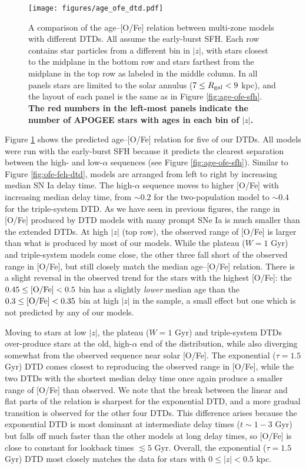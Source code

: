 \documentclass[twocolumn,twocolappendix,linenumbers]{aastex631}
\begin{document}
\begin{figure*}
    \centering
    \texttt{[image: figures/age\_ofe\_dtd.pdf]}
    \caption{A comparison of the age--[O/Fe] relation between multi-zone models with different DTDs. All assume the early-burst SFH. Each row contains star particles from a different bin in $|z|$, with stars closest to the midplane in the bottom row and stars farthest from the midplane in the top row as labeled in the middle column. In all panels stars are limited to the solar annulus ($7\leq R_{\rm gal}<9$ kpc), and the layout of each panel is the same as in Figure \ref{fig:age-ofe-sfh}. {\bf The red numbers in the left-most panels indicate the number of APOGEE stars with  ages in each bin of $|z|$.}}
    \label{fig:age-ofe-dtd}
\end{figure*}

Figure \ref{fig:age-ofe-dtd} shows the predicted age--[O/Fe] relation for five of our DTDs. All models were run with the early-burst SFH because it predicts the clearest separation between the high- and low-$\alpha$ sequences (see Figure \ref{fig:age-ofe-sfh}). Similar to Figure \ref{fig:ofe-feh-dtd}, models are arranged from left to right by increasing median SN Ia delay time. The high-$\alpha$ sequence moves to higher [O/Fe] with increasing median delay time, from $\sim0.2$ for the two-population model to $\sim0.4$ for the triple-system DTD. As we have seen in previous figures, the range in [O/Fe] produced by DTD models with many prompt SNe Ia is much smaller than the extended DTDs. At high $|z|$ (top row), the observed range of [O/Fe] is larger than what is produced by most of our models. While the plateau ($W=1$ Gyr) and triple-system models come close, the other three fall short of the observed range in [O/Fe], but still closely match the median age--[O/Fe] relation. There is a slight reversal in the observed trend for the stars with the highest [O/Fe]: the $0.45\leq{\rm [O/Fe]}<0.5$ bin has a slightly \textit{lower} median age than the $0.3\leq{\rm [O/Fe]}<0.35$ bin at high $|z|$ in the  sample, a small effect but one which is not predicted by any of our models.

Moving to stars at low $|z|$, the plateau ($W=1$ Gyr) and triple-system DTDs over-produce stars at the old, high-$\alpha$ end of the distribution, while also diverging somewhat from the observed sequence near solar [O/Fe]. The exponential ($\tau=1.5$ Gyr) DTD comes closest to reproducing the observed range in [O/Fe], while the two DTDs with the shortest median delay time once again produce a smaller range of [O/Fe] than observed. We note that the break between the linear and flat parts of the relation is sharpest for the exponential DTD, and a more gradual transition is observed for the other four DTDs. This difference arises because the exponential DTD is most dominant at intermediate delay times ($t\sim 1-3$ Gyr) but falls off much faster than the other models at long delay times, so [O/Fe] is close to constant for lookback times $\lesssim 5$ Gyr. Overall, the exponential ($\tau=1.5$ Gyr) DTD most closely matches the data for stars with $0\leq|z|<0.5$ kpc.
\end{document}
